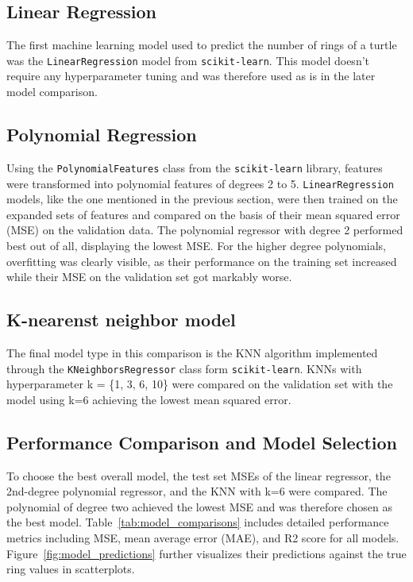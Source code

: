 \documentclass[twocolumn]{article}
\begin{document}
\subsection{Linear Regression}
The first machine learning model used to predict the number of rings of a turtle was the \texttt{LinearRegression} model from \texttt{scikit-learn}. This model doesn't require any hyperparameter tuning and was therefore used as is in the later model comparison.

\subsection{Polynomial Regression}

Using the \texttt{PolynomialFeatures} class from the \texttt{scikit-learn} library, features were transformed into polynomial features of degrees 2 to 5. 
\texttt{LinearRegression} models, like the one mentioned in the previous section, were then trained on the expanded sets of features and compared on the basis of their mean squared error (MSE) on the validation data.
The polynomial regressor with degree 2 performed best out of all, displaying the lowest MSE. For the higher degree polynomials, overfitting was clearly visible, as their performance on the training set increased while their MSE on the validation set got markably worse.

\subsection{K-nearenst neighbor model}

The final model type in this comparison is the KNN algorithm implemented through the \texttt{KNeighborsRegressor} class form \texttt{scikit-learn}.
KNNs with hyperparameter k = \{1, 3, 6, 10\} were compared on the validation set with the model using k=6 achieving the lowest mean squared error.

\subsection{Performance Comparison and Model Selection}

To choose the best overall model, the test set MSEs of the linear regressor, the 2nd-degree polynomial regressor, and the KNN with k=6 were compared. The polynomial of degree two achieved the lowest MSE and was therefore chosen as the best model. Table~\ref{tab:model_comparisons} includes detailed performance metrics including MSE, mean average error (MAE), and R2 score for all models. Figure~\ref{fig:model_predictions} further visualizes their predictions against the true ring values in scatterplots.
\end{document}
